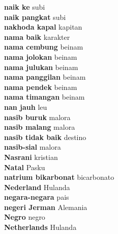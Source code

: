 \textbf{ naik ke  } subi \\
\textbf{ naik pangkat  } subi \\
\textbf{ nakhoda kapal  } kapitan \\
\textbf{ nama baik  } karakter \\
\textbf{ nama cembung  } beinam \\
\textbf{ nama jolokan  } beinam \\
\textbf{ nama julukan  } beinam \\
\textbf{ nama panggilan  } beinam \\
\textbf{ nama pendek  } beinam \\
\textbf{ nama timangan  } beinam \\
\textbf{ nan jauh  } leu \\
\textbf{ nasib buruk  } malora \\
\textbf{ nasib malang  } malora \\
\textbf{ nasib tidak baik  } destino \\
\textbf{ nasib-sial  } malora \\
\textbf{ Nasrani  } kristian \\
\textbf{ Natal  } Pasku \\
\textbf{ natrium bikarbonat  } bicarbonato \\
\textbf{ Nederland  } Hulanda \\
\textbf{ negara-negara  } pais \\
\textbf{ negeri Jerman  } Alemania \\
\textbf{ Negro  } negro \\
\textbf{ Netherlands  } Hulanda \\

